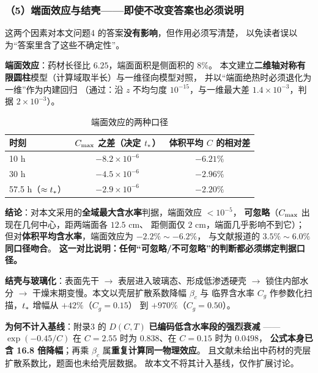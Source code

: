 \subsubsection*{（5）端面效应与结壳——即使不改变答案也必须说明}
\label{sec:endface}
\label{sec:crust}

这两个因素对本文问题4 的答案\textbf{没有影响}，但作用必须写清楚，
以免读者误以为``答案里含了这些不确定性''。

\textbf{端面效应}：药材长径比 $6.25$，端面面积是侧面积的 $8\%$。
本文建立\textbf{二维轴对称有限圆柱}模型（计算域取半长）与一维径向模型对照，
并以``端面绝热时必须退化为一维''作为内建回归
（通过：沿 $z$ 不均匀度 $10^{-15}$，与一维最大差 $1.4\times10^{-3}$，判据 $2\times10^{-3}$）。

\begin{table}[H]
  \centering
  \caption{端面效应的两种口径}
  \label{tab:endface}
  \footnotesize
  \begin{tabular}{@{}lcc@{}}
    \toprule
    时刻 & $C_{\max}$ 之差（决定 $t_{*}$） & 体积平均 $C$ 的相对差 \\
    \midrule
    10 h & $-8.2\times10^{-6}$ & $-6.21\%$ \\
    30 h & $-4.5\times10^{-6}$ & $-2.96\%$ \\
    57.5 h（$\approx t_{*}$） & $-2.9\times10^{-6}$ & $-2.20\%$ \\
    \bottomrule
  \end{tabular}
\end{table}

\textbf{结论}：对本文采用的\textbf{全域最大含水率}判据，端面效应 $<10^{-5}$，
\textbf{可忽略}（$C_{\max}$ 出现在几何中心，距两端面各 $12.5$ cm、
距侧面仅 $2$ cm，端面几乎影响不到它）；
但对\textbf{体积平均含水率}，端面效应为 $-2.2\%\sim-6.2\%$，
与文献报道的 $3.5\%\sim6.0\%$ \textbf{同口径吻合}。
\textbf{这一对比说明：任何``可忽略/不可忽略''的判断都必须绑定判据口径。}

\textbf{结壳与玻璃化}：表面先干 $\to$ 表层进入玻璃态、形成低渗透硬壳 $\to$
锁住内部水分 $\to$ 干燥末期变慢。本文以壳层扩散系数降幅 $\beta_c$ 与
临界含水率 $C_g$ 作参数化扫描，$t_{*}$ 增幅从 $+42\%$（$C_g=0.15$）
到 $+970\%$（$C_g=0.50$）。

\textbf{为何不计入基线}：附录3 的 $D(C,T)$ \textbf{已编码低含水率段的强烈衰减}
——$\exp(-0.45/C)$ 在 $C=2.55$ 时为 $0.838$、在 $C=0.15$ 时为 $0.0498$，
\textbf{公式本身已含 16.8 倍降幅}；再乘 $\beta_c$ 属\textbf{重复计算同一物理效应}。
且文献未给出中药材的壳层扩散系数比，题面也未给壳层数据。
故本文不将其计入基线，仅作扩展讨论。
